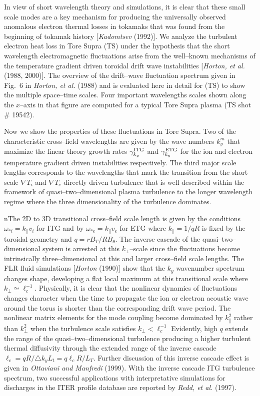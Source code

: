 \documentclass[a4paper,openany,12pt]{book}
\begin{document}
In view of short wavelength theory and simulations, it is clear that these small scale modes are a key mechanism for producing the universally observed anomalous electron thermal losses in tokamaks that was found from the beginning of tokamak history [\emph{Kadomtsev} (1992)]. We analyze the turbulent electron heat loss in Tore Supra (TS) under the hypothesis that the short wavelength electromagnetic fluctuations arise from the well--known mechanisms of the temperature gradient driven toroidal drift wave instabilities [\emph{Horton, et al.} (1988, 2000)]. The overview of the drift--wave fluctuation spectrum given in Fig.~6 in \emph{Horton, et al.} (1988) and is evaluated here in detail for (TS) to show the multiple space--time scales. Four important wavelengths scales shown along the $x$--axis in that figure are computed for a typical Tore Supra plasma (TS shot \# 19542). 

Now we show the properties of these fluctuations in Tore Supra. Two of the characteristic cross--field wavelengths are given by the wave numbers $k_y^m$ that maximize the linear theory growth rates $\gamma_{k_ y}^{\rm ITG}$ and $\gamma_{k_y}^{\rm ETG}$ for the ion and electron temperature gradient driven instabilities respectively. The third major scale lengths corresponds to the wavelengths that mark the transition from the short scale $\nabla T_i$ and $\nabla T_e$ directly driven turbulence that is well described within the framework of quasi--two--dimensional plasma turbulence to the longer wavelength regime where the three dimensionality of the turbulence dominates. 

 nThe 2D to 3D transitional cross--field scale length is given by the conditions $\omega_{*i}=k_\|v_i$ for ITG and by $\omega_{*e}=k_\|v_e$ for ETG where $k_\|=1/qR$ is fixed by the toroidal geometry and $q=rB_T/RB_\theta$. The inverse cascade of the quasi--two--dimensional system is arrested at this $ k_\perp$--scale since the fluctuations become intrinsically three--dimensional at this and larger cross--field scale lengths. The FLR fluid simulations [\emph{Horton} (1990)] show that the $k_y$ wavenumber spectrum changes shape, developing a flat local maximum at this transitional scale where $k_\perp\simeq\ell_c^{-1}$. Physically, it is clear that the nonlinear dynamics of fluctuations changes character when the time to propagate the ion or electron acoustic wave around the torus is shorter than the corresponding drift wave period. The nonlinear matrix elements for the mode coupling become dominated by $k_\|^2$ rather than $k_\perp^2$ when the turbulence scale satisfies $k_\perp<\ell_c^{-1}$ Evidently, high $q$ extends the range of the quasi--two--dimensional turbulence producing a higher turbulent thermal diffusivity through the extended range of the inverse cascade $\ell_c=qR/\triangle k_yL_t=q\ell_c R/L_T$. Further discussion of this inverse cascade effect is given in \emph{Ottaviani and Manfredi} (1999). With the inverse cascade ITG turbulence spectrum, two successful applications with interpretative simulations for discharges in the ITER profile database are reported by \emph{Redd, et al.} (1997). 
\end{document}
